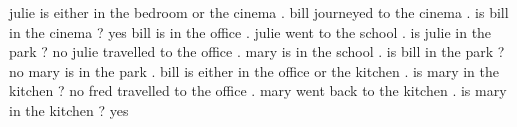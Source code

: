 \begin{tcbraster}[raster columns=2, size=minimal, raster valign=top]
    \begin{tcolorbox}[mybox, title=Task 10:Name, height fill] 
    \tiny
julie is either in the bedroom or the cinema . bill journeyed to the cinema . is bill in the cinema ? yes bill is in the office . julie went to the school . is julie in the park ? no julie travelled to the office . mary is in the school . is bill in the park ? no mary is in the park . bill is either in the office or the kitchen . is mary in the kitchen ? no fred travelled to the office . mary went back to the kitchen . is mary in the kitchen ? yes
    \end{tcolorbox}       
\end{tcbraster}
  












